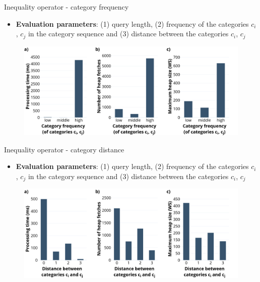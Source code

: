 \documentclass[18pt]{beamer}
\begin{document}
\begin{frame}{Inequality operator - category frequency}

	\begin{itemize}
		\item \textbf{Evaluation parameters}: (1) query length, (2) frequency of the categories $c_i$, $c_j$ in the category sequence and (3) distance between the categories $c_i$, $c_j$
	\end{itemize}
	
	\begin{figure}[h]
		\includegraphics[scale=0.275]{neo_frequency.png}
	\end{figure}

\end{frame}

\begin{frame}{Inequality operator - category distance}

	\begin{itemize}
		\item \textbf{Evaluation parameters}: (1) query length, (2) frequency of the categories $c_i$, $c_j$ in the category sequence and (3) distance between the categories $c_i$, $c_j$
	\end{itemize}
	
	\begin{figure}[h]
		\includegraphics[scale=0.275]{neo_distance.png}
	\end{figure}

\end{frame}
\end{document}
